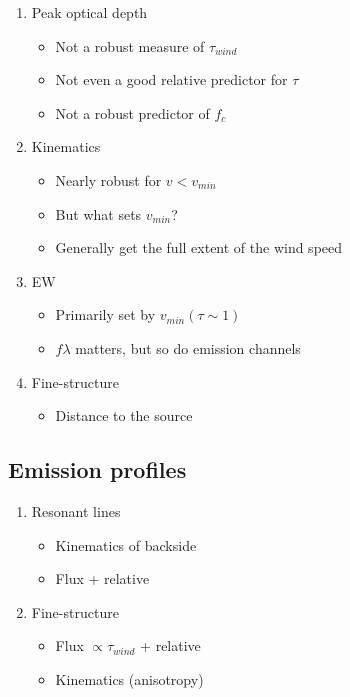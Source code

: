 \documentclass[12pt,preprint]{aastex}
\begin{document}
 \begin{enumerate}
   \item Peak optical depth
     \begin{itemize}
       \item Not a robust measure of $\tau_{wind}$
       \item Not even a good relative predictor for $\tau$
       \item Not a robust predictor of $f_c$
     \end{itemize}
   \item Kinematics
     \begin{itemize}
       \item Nearly robust for $v<v_{min}$
       \item But what sets $v_{min}$?
       \item Generally get the full extent of the wind speed
     \end{itemize}
   \item EW
     \begin{itemize}
       \item Primarily set by $v_{min}(\tau \sim 1)$
       \item $f\lambda$ matters, but so do emission channels
     \end{itemize}
   \item Fine-structure
     \begin{itemize}
       \item Distance to the source
     \end{itemize}
 \end{enumerate}
     
\subsection{Emission profiles}

 \begin{enumerate}
   \item Resonant lines
     \begin{itemize}
       \item Kinematics of backside
       \item Flux + relative
    \end{itemize}
   \item Fine-structure
     \begin{itemize}
       \item Flux $\propto \tau_{wind}$ + relative
       \item Kinematics (anisotropy)
    \end{itemize}
 \end{enumerate}
     
\end{document}
